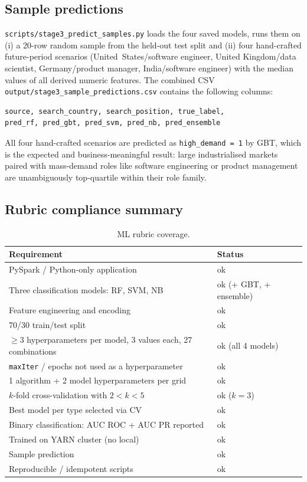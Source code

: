 \documentclass[11pt,a4paper]{article}
\begin{document}
\subsection{Sample predictions}
\texttt{scripts/stage3\_predict\_samples.py} loads the four saved
models, runs them on (i) a 20-row random sample from the held-out
test split and (ii) four hand-crafted future-period scenarios
(United~States/software engineer, United Kingdom/data scientist,
Germany/product manager, India/software engineer) with the median
values of all derived numeric features.  The combined CSV
\texttt{output/stage3\_sample\_predictions.csv} contains the
following columns:

\begin{lstlisting}[style=plain]
source, search_country, search_position, true_label,
pred_rf, pred_gbt, pred_svm, pred_nb, pred_ensemble
\end{lstlisting}

All four hand-crafted scenarios are predicted as
\texttt{high\_demand = 1} by GBT, which is the expected and
business-meaningful result: large industrialised markets paired with
mass-demand roles like software engineering or product management are
unambiguously top-quartile within their role family.

\subsection{Rubric compliance summary}
\begin{table}[h]
\centering
\caption{ML rubric coverage.}
\label{tab:rubric}
\small
\begin{tabularx}{\linewidth}{X l}
\toprule
\textbf{Requirement} & \textbf{Status} \\
\midrule
PySpark / Python-only application & ok \\
Three classification models: RF, SVM, NB & ok (+ GBT, + ensemble) \\
Feature engineering and encoding & ok \\
70/30 train/test split & ok \\
$\geq 3$ hyperparameters per model, 3 values each, 27 combinations & ok (all 4 models) \\
\texttt{maxIter} / epochs not used as a hyperparameter & ok \\
1 algorithm + 2 model hyperparameters per grid & ok \\
$k$-fold cross-validation with $2 < k < 5$ & ok ($k = 3$) \\
Best model per type selected via CV & ok \\
Binary classification: AUC ROC + AUC PR reported & ok \\
Trained on YARN cluster (no local) & ok \\
Sample prediction & ok \\
Reproducible / idempotent scripts & ok \\
\bottomrule
\end{tabularx}
\end{table}
\end{document}
